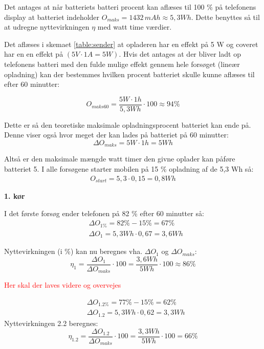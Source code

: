 Det antages at når batteriets batteri procent kan aflæses til 100 \% på telefonens display at batteriet indeholder $O_{maks}=1432\, mAh \approx 5,3 Wh$. Dette benyttes så til at udregne nyttevirkningen $\eta$ med watt time værdier.

Det aflæses i skemaet \ref{table:sender} at opladeren har en effekt på 5 W og coveret har en en effekt på $(5 V \cdot 1 A = 5 W)$. Hvis det antages at der bliver ladt op telefonens batteri med den fulde mulige effekt gennem hele forsøget (lineær opladning) kan der bestemmes hvilken procent batteriet skulle kunne aflæses til efter 60 minutter:

\begin{equation}
O_{maks60}= \frac{5 W\cdot 1h}{5,3Wh} \cdot 100 \approx 94 \%
\label{eq:omaks}
\end{equation}

Dette er så den teoretiske maksimale opladningsprocent batteriet kan ende på. Denne viser også hvor meget der kan lades på batteriet på 60 minutter:
\begin{equation}
\Delta O_{maks} = 5 W \cdot 1 h = 5Wh
\end{equation}

Altså er den maksimale mængde watt timer den givne oplader kan påføre batteriet 5. I alle forsøgene starter mobilen på 15 \% opladning af de 5,3 Wh så:
\begin{align*}
O_{start} = 5,3 \cdot 0,15 = 0,8 Wh
\end{align*}
 

\textbf{1. kør}

I det første forsøg ender telefonen på 82 \% efter 60 minutter så:
\begin{align*}
& \Delta O_{1\%} = 82\%-15\% =  67\%  \\
& \Delta O_1 = 5,3 Wh \cdot 0,67 = 3,6 Wh
\end{align*}


Nyttevirkningen (i \%) kan nu beregnes vha. $\Delta O_1$ og $\Delta O_{maks}$:  
\begin{equation}
\eta_1 = \frac{\Delta O_1}{\Delta O_{maks}} \cdot 100 = \frac{3,6 Wh}{5 Wh} \cdot 100 \approx 86 \%
\end{equation}

\textcolor{red}{Her skal der laves videre og overvejes}

\begin{align*}
& \Delta O_{1.2\%} = 77\%-15\% =  62\%  \\
& \Delta O_{1.2} = 5,3 Wh \cdot 0,62 = 3,3 Wh
\end{align*}
Nyttevirkningen 2.2 beregnes:
\begin{equation}
\eta_{1.2} = \frac{\Delta O_{1.2}}{\Delta O_{maks}} \cdot 100 = \frac{3,3 Wh}{5 Wh} \cdot 100 = 66 \%
\end{equation}

